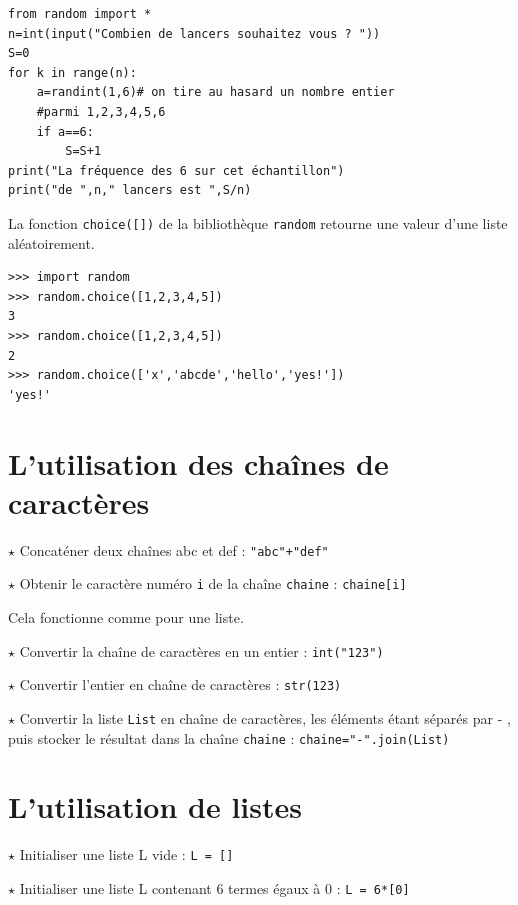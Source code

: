 \begin{lstlisting}
from random import *
n=int(input("Combien de lancers souhaitez vous ? "))
S=0
for k in range(n):
    a=randint(1,6)# on tire au hasard un nombre entier 
    #parmi 1,2,3,4,5,6
    if a==6:
        S=S+1
print("La fréquence des 6 sur cet échantillon")
print("de ",n," lancers est ",S/n)
\end{lstlisting}

La fonction \verb!choice([])! de la bibliothèque \verb!random! retourne une valeur d'une liste aléatoirement. 

\begin{lstlisting}
>>> import random
>>> random.choice([1,2,3,4,5])
3
>>> random.choice([1,2,3,4,5])
2
>>> random.choice(['x','abcde','hello','yes!'])
'yes!'
\end{lstlisting}

\section{L'utilisation des chaînes de caractères}

$\star$ Concaténer deux chaînes \og abc\fg{} et \og def\fg{} : \verb~"abc"+"def"~

$\star$ Obtenir le caractère numéro \verb~i~ de la chaîne \verb~chaine~ : \verb~chaine[i]~

Cela fonctionne comme pour une liste.

$\star$ Convertir la chaîne de caractères \fg{} en un entier : \verb~int("123")~

$\star$ Convertir l'entier  \fg{}  en chaîne de caractères : \verb~str(123)~

$\star$ Convertir la liste \verb~List~ en chaîne de caractères, les éléments étant séparés par \og - \fg{}, puis stocker le résultat dans la chaîne \verb~chaine~ : \verb~chaine="-".join(List)~

\section{L'utilisation de listes}


$\star$ Initialiser une liste L vide : \verb!L = []!

$\star$ Initialiser une liste L contenant 6 termes égaux à 0 : \verb!L = 6*[0]!


